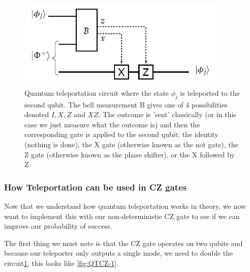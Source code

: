 \begin{figure}[h]
    \centering
    \includegraphics[width=0.9\textwidth]{images/QT circuit.png}
    \caption{Quantum teleportation circuit where the state $\phi_j$ is teleported to the second qubit. The bell measurement B gives one of 4 possibilities denoted $I, X, Z$ and $XZ$. The outcome is 'sent' classically (or in this case we just measure what the outcome is) and then the corresponding gate is applied to the second qubit; the identity (nothing is done), the X gate (otherwise known as the not gate), the Z gate (otherwise known as the phase shifter), or the X followed by Z}\label{fig:QT circuit}
\end{figure}

\subsubsection{How Teleportation can be used in CZ gates}
Now that we understand how quantum teleportation works in theory, we now want to implement this with our non-deterministic CZ gate to see if we can improve our probability of success.
\par 
The first thing we must note is that the CZ gate operates on two qubits and because our teleporter only outputs a single mode, we need to double the circuit\ref{fig:QT circuit}, this looks like \ref{fig:QTCZ-1}.

